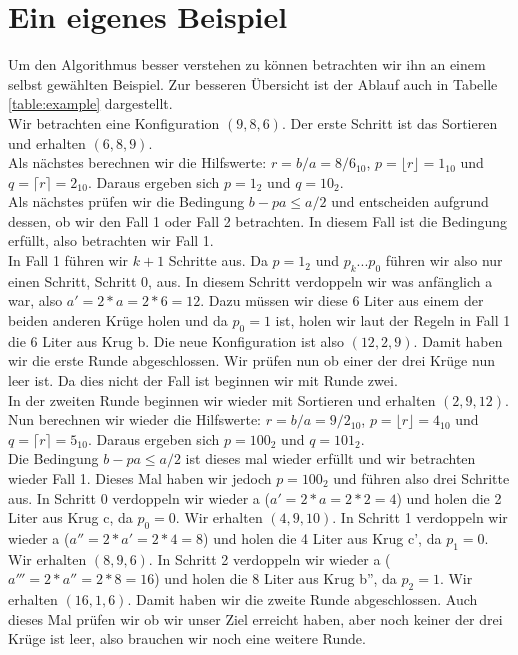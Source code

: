 \chapter{Ein eigenes Beispiel} 
Um den Algorithmus besser verstehen zu können betrachten wir ihn an einem selbst gewählten Beispiel. Zur besseren Übersicht ist der Ablauf auch in Tabelle \ref{table:example} dargestellt. \\
Wir betrachten eine Konfiguration $(9, 8, 6)$. Der erste Schritt ist das Sortieren und erhalten $(6, 8, 9)$. \\
Als nächstes berechnen wir die Hilfswerte: $r=b/a=8/6_{10}$, $p=\lfloor r \rfloor = 1_{10}$ und $q=\lceil r \rceil = 2_{10}$. Daraus ergeben sich $p = 1_{2}$ und $q = 10_{2}$. \\
Als nächstes prüfen wir die Bedingung $b-pa \leq a/2$ und entscheiden aufgrund dessen, ob wir den Fall 1 oder Fall 2 betrachten. In diesem Fall ist die Bedingung erfüllt, also betrachten wir Fall 1. \\
In Fall 1 führen wir $k+1$ Schritte aus. Da $p= 1_{2}$ und $p_k...p_0$ führen wir also nur einen Schritt, Schritt 0, aus. In diesem Schritt verdoppeln wir was anfänglich a war, also $a'=2*a=2*6=12$. Dazu müssen wir diese 6 Liter aus einem der beiden anderen Krüge holen und da $p_0=1$ ist, holen wir laut der Regeln in Fall 1 die 6 Liter aus Krug b. Die neue Konfiguration ist also $(12, 2, 9)$. Damit haben wir die erste Runde abgeschlossen. Wir prüfen nun ob einer der drei Krüge nun leer ist. Da dies nicht der Fall ist beginnen wir mit Runde zwei.\\

In der zweiten Runde beginnen wir wieder mit Sortieren und erhalten $(2, 9, 12)$. Nun berechnen wir wieder die Hilfswerte: $r=b/a=9/2_{10}$, $p=\lfloor r \rfloor = 4_{10}$ und $q=\lceil r \rceil = 5_{10}$. Daraus ergeben sich $p = 100_{2}$ und $q = 101_{2}$. \\
Die Bedingung $b-pa \leq a/2$ ist dieses mal wieder erfüllt und wir betrachten wieder Fall 1. Dieses Mal haben wir jedoch $p=100_{2}$ und führen also drei Schritte aus. In Schritt 0 verdoppeln wir wieder a ($a'=2*a=2*2=4$) und holen die 2 Liter aus Krug c, da $p_0=0$. Wir erhalten $(4, 9, 10)$. In Schritt 1 verdoppeln wir wieder a ($a''=2*a'=2*4=8$) und holen die 4 Liter aus Krug c', da $p_1=0$. Wir erhalten $(8, 9, 6)$. In Schritt 2 verdoppeln wir wieder a ($a'''=2*a''=2*8=16$) und holen die 8 Liter aus Krug b'', da $p_2=1$. Wir erhalten $(16, 1, 6)$. Damit haben wir die zweite Runde abgeschlossen. Auch dieses Mal prüfen wir ob wir unser Ziel erreicht haben, aber noch keiner der drei Krüge ist leer, also brauchen wir noch eine weitere Runde.\\

